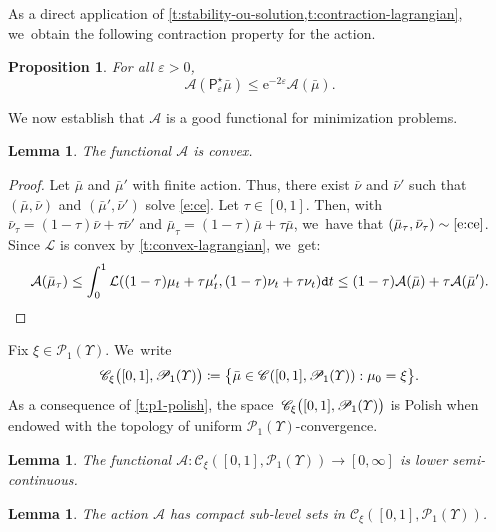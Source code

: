 \documentclass[10pt]{amsart}
\newtheorem{lemma}[theorem]{Lemma}
\newtheorem{proposition}[theorem]{Proposition}
\theoremstyle{definition}
\theoremstyle{remark}
\DeclarePairedDelimiter{\paren}{\lparen}{\rparen}
\DeclarePairedDelimiter{\set}{\lbrace}{\rbrace}
\begin{document}
As a direct application of \cref{t:stability-ou-solution,t:contraction-lagrangian}, we~obtain the following contraction property for the action.
\begin{proposition}\label{t:contraction-action}
For all $\varepsilon > 0$,
\begin{equation*}
\mathcal{A}(\mathsf{P}^{\star}_{\varepsilon} \bar{\mu}) \le \mathrm{e}^{-2\varepsilon} \mathcal{A}(\bar{\mu}).
\end{equation*}
\end{proposition}

We now establish that $\mathcal{A}$ is a good functional for minimization problems.

\begin{lemma}\label{t:convex-action}
The functional $\mathcal{A}$ is convex.
\end{lemma}

\begin{proof}
Let $\bar{\mu}$ and $\bar{\mu}'$ with finite action.
Thus, there exist $\bar{\nu}$ and $\bar{\nu}'$ such that $(\bar{\mu}, \bar{\nu})$ and $(\bar{\mu}', \bar{\nu}')$ solve \cref{e:ce}.
Let $\tau \in [0,1]$.
Then, with $\bar{\nu}_{\tau} = (1-\tau) \bar{\nu} + \tau \bar{\nu}'$ and $\bar{\mu}_{\tau} = (1-\tau) \bar{\mu} + \tau \bar{\mu}$, we~have that $(\bar{\mu}_{\tau}, \bar{\nu}_{\tau}) \sim \cref{e:ce}$.
Since $\mathcal{L}$ is convex by \cref{t:convex-lagrangian}, we~get:
\begin{equation*}
\mathcal{A}(\bar{\mu}_{\tau}) \leq \int_{0}^{1} \mathcal{L}\paren*{(1-\tau) \mu_{t} + \tau \mu'_{t}, (1-\tau) \nu_{t} + \tau \nu_{t}} \mathtt{d} t \leq (1-\tau) \mathcal{A}(\bar{\mu}) + \tau \mathcal{A}(\bar{\mu}').
\qedhere
\end{equation*}
\end{proof}

Fix $\xi \in \mathscr{P}_{1}(\varUpsilon)$. We~write
\begin{equation*}
\mathscr{C}_{\xi}\paren[\big]{[0,1], \mathscr{P}_{1}(\varUpsilon)} \coloneq \set[\big]{ \bar{\mu} \in \mathscr{C}([0,1], \mathscr{P}_{1}(\varUpsilon)) : \mu_{0} = \xi }.
\end{equation*}
As a consequence of \cref{t:p1-polish}, the space~$\mathscr{C}_{\xi}\paren[\big]{[0,1], \mathscr{P}_{1}(\varUpsilon)}$ is Polish when endowed with the topology of uniform $\mathscr{P}_1(\varUpsilon)$-convergence.

\begin{lemma}\label{t:lsc-action}
The functional $\mathcal{A} \colon \mathscr{C}_{\xi}([0,1], \mathscr{P}_{1}(\varUpsilon)) \to [0,\infty]$ is lower semi-con\-tin\-u\-ous.
\end{lemma}
\begin{lemma}\label{t:compact-action}
The action $\mathcal{A}$ has compact sub-level sets in $\mathscr{C}_{\xi}([0,1], \mathscr{P}_{1}(\varUpsilon))$.
\end{lemma}
\end{document}
